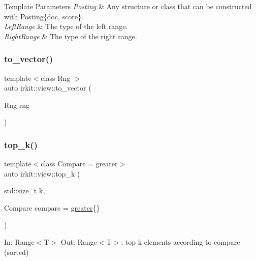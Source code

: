 \begin{DoxyTemplParams}{Template Parameters}
{\em Posting} & Any structure or class that can be constructed with {\ttfamily Posting\{doc, score\}}. \\
\hline
{\em Left\+Range} & The type of the left range. \\
\hline
{\em Right\+Range} & The type of the right range. \\
\hline
\end{DoxyTemplParams}
\mbox{\label{namespaceirkit_1_1view_a47e3af80728642c02c0204e1db2ecbd4}} 
\subsubsection{\texorpdfstring{to\+\_\+vector()}{to\_vector()}}
{\footnotesize\ttfamily template$<$class Rng $>$ \\
auto irkit\+::view\+::to\+\_\+vector (\begin{DoxyParamCaption}\item[{Rng}]{rng }\end{DoxyParamCaption})}

\mbox{\label{namespaceirkit_1_1view_a0c54fd641ca22e5cb97fd55a3f5921a2}} 
\subsubsection{\texorpdfstring{top\+\_\+k()}{top\_k()}\hspace{0.1cm}{\footnotesize\ttfamily [1/2]}}
{\footnotesize\ttfamily template$<$class Compare  = greater$>$ \\
auto irkit\+::view\+::top\+\_\+k (\begin{DoxyParamCaption}\item[{std\+::size\+\_\+t}]{k,  }\item[{Compare}]{compare = {\ttfamily \mbox{\hyperlink{structirkit_1_1view_1_1greater}{greater}}\{\}} }\end{DoxyParamCaption})}

In\+: Range$<$\+T$>$ Out\+: Range$<$\+T$>$\+: top k elements according to compare (sorted) \mbox{\label{namespaceirkit_1_1view_a94331e22539c88bf23e8d801c004fee2}} 
